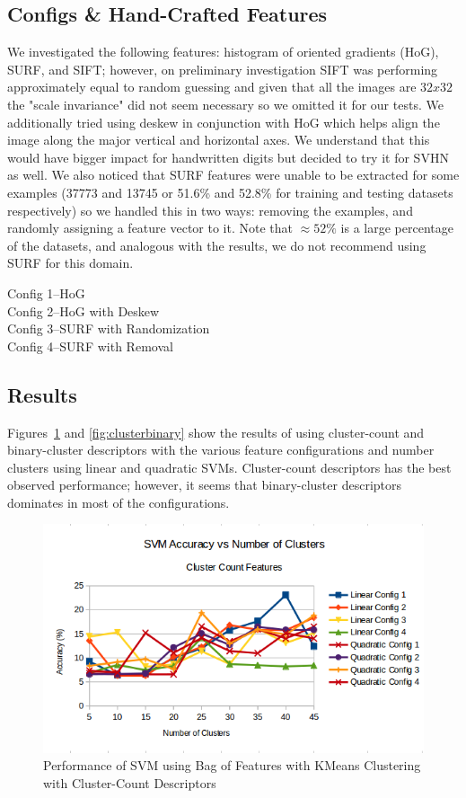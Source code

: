 \documentclass{article} %
\begin{document}
\subsection{Configs \& Hand-Crafted Features}
We investigated the following features: histogram of oriented gradients (HoG), SURF, and SIFT; however, on preliminary investigation SIFT was performing approximately equal to random guessing and given that all the images are $32x32$ the "scale invariance" did not seem necessary so we omitted it for our tests.  We additionally tried using deskew in conjunction with HoG which helps align the image along the major vertical and horizontal axes.  We understand that this would have bigger impact for handwritten digits \cite{handwrittendigits} but decided to try it for SVHN as well.  We also noticed that SURF features were unable to be extracted for some examples (37773 and 13745 or 51.6\% and 52.8\% for training and testing datasets respectively) so we handled this in two ways: removing the examples, and randomly assigning a feature vector to it.  Note that $\approx 52\%$ is a large percentage of the datasets, and analogous with the results, we do not recommend using SURF for this domain.

Config 1--HoG\\
Config 2--HoG with Deskew\\
Config 3--SURF with Randomization\\
Config 4--SURF with Removal\\

\subsection{Results}
Figures~\ref{fig:clustercount} and \ref{fig:clusterbinary} show the results of using cluster-count and binary-cluster descriptors with the various feature configurations and number clusters using linear and quadratic SVMs. Cluster-count descriptors has the best observed performance; however, it seems that binary-cluster descriptors dominates in most of the configurations.

\begin{figure}
\centering
	\includegraphics[width=0.9\linewidth]{./plots/svm/clustercount}
    	\caption{Performance of SVM using Bag of Features with KMeans Clustering with Cluster-Count Descriptors}
	\label{fig:clustercount}
\end{figure}
\end{document}
